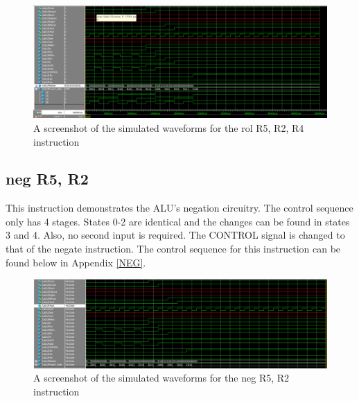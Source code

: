 \documentclass{article}
\begin{document}
    \begin{figure}[h!]
        \begin{center}
            \includegraphics[width=13cm]{rol}
            \caption{A screenshot of the simulated waveforms for the rol R5, R2, R4 instruction}
        \end{center}
    \end{figure}

    \subsection{neg R5, R2}
    This instruction demonstrates the ALU's negation circuitry. The control sequence only has 4 stages. States 0-2 are identical and the changes can be found in states 3 and 4. Also, no second input is required. The CONTROL signal is changed to that of the negate instruction. The control sequence for this instruction can be found below in Appendix \ref{NEG}.

    \begin{figure}[h!]
        \begin{center}
            \includegraphics[width=13cm]{neg}
            \caption{A screenshot of the simulated waveforms for the neg R5, R2 instruction}
        \end{center}
    \end{figure}
\end{document}
